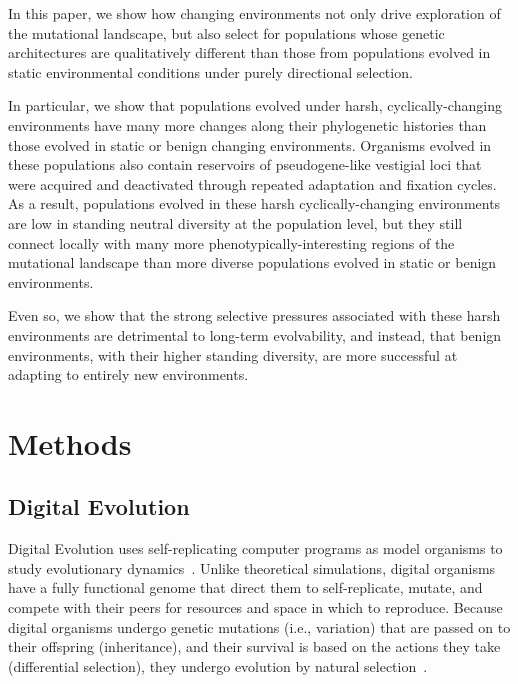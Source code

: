 \documentclass[10pt,letterpaper]{article}
\begin{document}
In this paper, we show how changing environments not only drive exploration of the mutational landscape, but also select for populations whose genetic architectures are qualitatively different than those from populations evolved in static environmental conditions under purely directional selection. 

In particular, we show that populations evolved under harsh, cyclically-changing environments have many more changes along their phylogenetic histories than those evolved in static or benign changing environments. Organisms evolved in these populations also contain reservoirs of pseudogene-like vestigial loci that were acquired and deactivated through repeated adaptation and fixation cycles. As a result, populations evolved in these harsh cyclically-changing environments are low in standing neutral diversity at the population level, but they still connect locally with many more phenotypically-interesting regions of the mutational landscape than more diverse populations evolved in static or benign environments.

Even so, we show that the strong selective pressures associated with these harsh environments are detrimental to long-term evolvability, and instead, that benign environments, with their higher standing diversity, are more successful at adapting to entirely new environments.


\section*{Methods}

\subsection*{Digital Evolution}
Digital Evolution uses self-replicating computer programs as model organisms to study evolutionary dynamics~\cite{mckinley_harnessing_2008}. Unlike theoretical simulations, digital organisms have a fully functional genome that direct them to self-replicate, mutate, and compete with their peers for resources and space in which to reproduce. Because digital organisms undergo genetic mutations (i.e., variation) that are passed on to their offspring (inheritance), and their survival is based on the actions they take (differential selection), they undergo evolution by natural selection~\cite{dennett_darwins_1995}.
\end{document}
